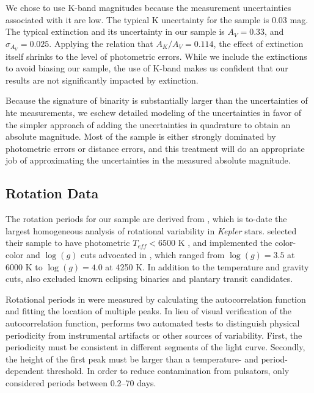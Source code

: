 \documentclass[manuscript]{aastex6}
\newcommand{\Kepler}{\mbox{\textit{Kepler}}}
\newcommand{\Teff}{\ensuremath{T_{eff}}}
\newcommand{\logg}{\ensuremath{\log(g)}}
\begin{document}
We chose to use K-band magnitudes because the measurement uncertainties
associated with it are low. The typical K uncertainty for the
\citep{McQuillan14} sample is 0.03 mag. The typical extinction and its
uncertainty in our sample is \(A_V = 0.33\), and \(\sigma_{A_V}=0.025\).
Applying the \citet{Cardelli89} relation that \(A_K/A_V = 0.114\), the effect
of extinction itself shrinks to the level of photometric errors. While we
include the extinctions to avoid biasing our sample, the use of K-band makes us
confident that our results are not significantly impacted by extinction.

Because the signature of binarity is substantially larger than the
uncertainties of hte measurements, we eschew detailed modeling of the
uncertainties in favor of the simpler approach of adding the uncertainties in
quadrature to obtain an absolute magnitude. Most of the sample is either
strongly dominated by photometric errors or distance errors, and this treatment
will do an appropriate job of approximating the uncertainties in the measured
absolute magnitude.

\subsection{Rotation Data}

The rotation periods for our sample are derived from \citet{McQuillan14}, 
which is to-date the largest homogeneous analysis of rotational variability in
\Kepler{} stars. \citet{McQuillan14} selected their sample to have photometric
\(\Teff < 6500\) K \citep{Brown11,Dressing13}, and implemented the color-color
and \logg{} cuts advocated in \citet{Ciardi11}, which ranged from \(\logg = 
3.5\) at 6000 K to \(\logg = 4.0\) at 4250 K. 
In addition to the temperature and gravity cuts, \citet{McQuillan14} also 
excluded known eclipsing binaries and plantary transit candidates. 

Rotational periods in \citet{McQuillan14} were measured by calculating the 
autocorrelation function and fitting the location of multiple peaks. In lieu 
of visual verification of the autocorrelation function, \citet{McQuillan14}
performs two automated tests to distinguish physical periodicity from
instrumental artifacts or other sources of variability. First, the 
periodicity must be consistent in different segments of the light curve.
Secondly, the height of the first peak must be larger than a temperature- and
period-dependent threshold. In order to reduce contamination from pulsators, 
\citet{McQuillan14} only considered periods between 0.2--70 days.
\end{document}
